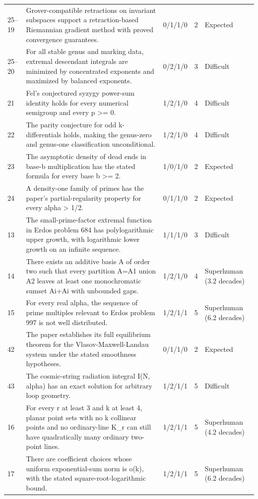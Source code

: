 \begin{landscape}
\begin{longtable}{@{}L{14mm}L{91mm}C{25mm}C{12mm}L{43mm}@{}}
25--19 & Grover-compatible retractions on invariant subspaces support a retraction-based Riemannian gradient method with proved convergence guarantees. & 0/1/1/0 & 2 & Expected \\
25--20 & For all stable genus and marking data, extremal descendant integrals are minimized by concentrated exponents and maximized by balanced exponents. & 0/2/1/0 & 3 & Difficult \\
21 & Fel's conjectured syzygy power-sum identity holds for every numerical semigroup and every p >= 0. & 1/2/1/0 & 4 & Difficult \\
22 & The parity conjecture for odd k-differentials holds, making the genus-zero and genus-one classification unconditional. & 1/2/1/0 & 4 & Difficult \\
23 & The asymptotic density of dead ends in base-b multiplication has the stated formula for every base b >= 2. & 1/0/1/0 & 2 & Expected \\
24 & A density-one family of primes has the paper's partial-regularity property for every alpha > 1/2. & 0/1/1/0 & 2 & Expected \\
13 & The small-prime-factor extremal function in Erdos problem 684 has polylogarithmic upper growth, with logarithmic lower growth on an infinite sequence. & 1/1/1/0 & 3 & Difficult \\
14 & There exists an additive basis A of order two such that every partition A=A1 union A2 leaves at least one monochromatic sumset Ai+Ai with unbounded gaps. & 1/2/1/0 & 4 & Superhuman (3.2 decades) \\
15 & For every real alpha, the sequence of prime multiples relevant to Erdos problem 997 is not well distributed. & 1/2/1/1 & 5 & Superhuman (6.2 decades) \\
42 & The paper establishes its full equilibrium theorem for the Vlasov-Maxwell-Landau system under the stated smoothness hypotheses. & 0/1/1/0 & 2 & Expected \\
43 & The cosmic-string radiation integral I(N, alpha) has an exact solution for arbitrary loop geometry. & 1/2/1/1 & 5 & Difficult \\
16 & For every r at least 3 and k at least 4, planar point sets with no k collinear points and no ordinary-line K\_r can still have quadratically many ordinary two-point lines. & 1/2/1/1 & 5 & Superhuman (4.2 decades) \\
17 & There are coefficient choices whose uniform exponential-sum norm is o(k), with the stated square-root-logarithmic bound. & 1/2/1/1 & 5 & Superhuman (6.2 decades) \\

\end{longtable}
\end{landscape}
